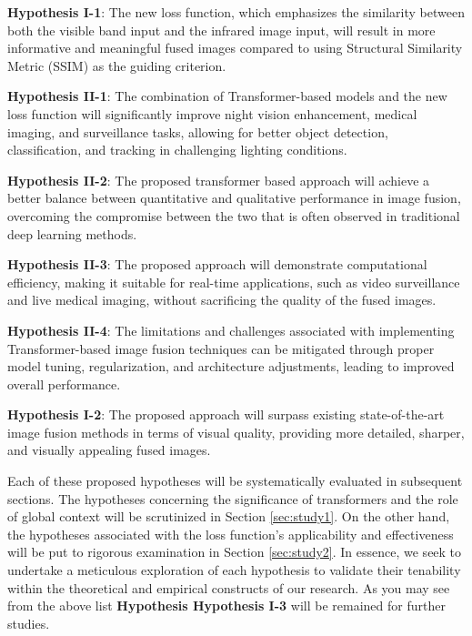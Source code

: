\begin{list}{}{}
    \item \textbf{Hypothesis I-1}: The new loss function, which emphasizes the similarity between both the visible band input and the infrared image input, will result in more informative and meaningful fused images compared to using Structural Similarity Metric (SSIM) as the guiding criterion.

    \item \textbf{Hypothesis II-1}: The combination of Transformer-based models and the new loss function will significantly improve night vision enhancement, medical imaging, and surveillance tasks, allowing for better object detection, classification, and tracking in challenging lighting conditions.
    
    \item \textbf{Hypothesis II-2}: The proposed transformer based approach will achieve a better balance between quantitative and qualitative performance in image fusion, overcoming the compromise between the two that is often observed in traditional deep learning methods.
    
    \item \textbf{Hypothesis II-3}: The proposed approach will demonstrate computational efficiency, making it suitable for real-time applications, such as video surveillance and live medical imaging, without sacrificing the quality of the fused images.
    
    \item \textbf{Hypothesis II-4}: The limitations and challenges associated with implementing Transformer-based image fusion techniques can be mitigated through proper model tuning, regularization, and architecture adjustments, leading to improved overall performance.
    
    \item \textbf{Hypothesis I-2}: The proposed approach will surpass existing state-of-the-art image fusion methods in terms of visual quality, providing more detailed, sharper, and visually appealing fused images.
    
\end{list}

Each of these proposed hypotheses will be systematically evaluated in subsequent sections. The hypotheses concerning the significance of transformers and the role of global context will be scrutinized in Section \ref{sec:study1}. On the other hand, the hypotheses associated with the loss function's applicability and effectiveness will be put to rigorous examination in Section \ref{sec:study2}. In essence, we seek to undertake a meticulous exploration of each hypothesis to validate their tenability within the theoretical and empirical constructs of our research. As you may see from the above list \textbf{Hypothesis Hypothesis I-3} will be remained for further studies.

